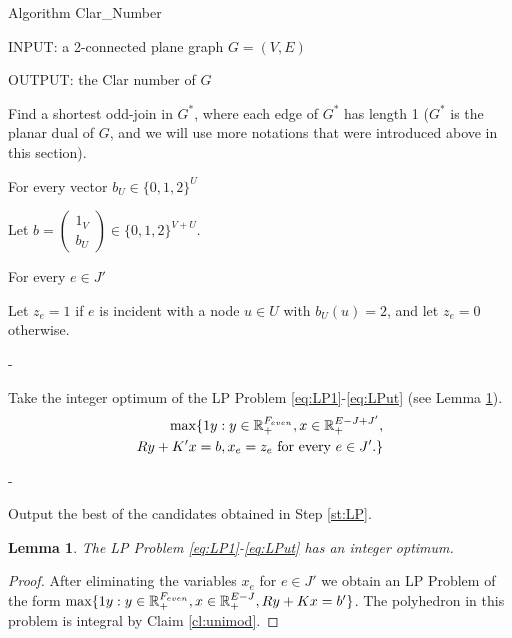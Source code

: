 \documentclass{article}
\makeatletter
\newcounter{Kulso}
\newenvironment{pszkod}[2][1]
{
  \setcounter{Kulso}{#1}
\sffamily
  \vspace{\topsep}              \noindent
{#2}
  \begin{list}{\rmfamily\arabic{Kulso}.\@arabic\c@enumiv.}
    {\usecounter{enumiv}\renewcommand\p@enumiv{\arabic{Kulso}.}
     \renewcommand\theenumiv{\@arabic\c@enumiv}
     \setlength{\parsep}{0pt}
     \setlength{\itemsep}{0pt}
     \setlength{\topsep}{0pt}
    }
  \psz@cimke{begin}
}
{
  \psz@cimke{end}
  \end{list}
  \vspace{\topsep}
}
\newlength{\tabhossz}
\newcommand{\untab}{\par \advance\@totalleftmargin -\tabhossz   \advance\linewidth \tabhossz
\parshape \@ne \@totalleftmargin \linewidth
\addtolength{\labelsep}{-\tabhossz}}
\newcommand{\psz@cimke}[1]{\item[{\makebox[\labelwidth][l]{#1}}]}
\newcommand{\Rset}{\mathbb{R}}
\newtheorem{lemma}{Lemma}
\makeatother
\begin{document}
\begin{pszkod}{Algorithm Clar\_Number}

\item[] INPUT: a 2-connected plane graph $G=(V,E)$

\item[] OUTPUT: the Clar number of $G$

\item Find a shortest odd-join in $G^*$,
where each edge of $G^*$ has length 1
($G^*$ is the planar dual of $G$, and we will use more  notations that were introduced above in this section).







\item For every vector $b_U\in \{0,1,2\}^U$ \label{st:iter}

\tab

  \item Let $b=\left(
    \begin{array}{c}
    1_V\\
    b_U
    \end{array}
    \right)\in \{0,1,2\}^{V+U}$. 

  \item For every $e\in J'$
    \tab

      \item Let $z_e = 1$  if $e$ is incident with a node $u\in U$ with $b_U(u) = 2$, and let $z_e = 0$ otherwise.

    \untab

  \item \label{st:LP} Take the integer optimum of the LP Problem
    \eqref{eq:LP1}-\eqref{eq:LPut} (see Lemma \ref{lem:intpoly}).
  \begin{eqnarray}
    \max\{1y: y\in \Rset_+^{\Feven}, x\in \Rset_+^{E-J+J'},\label{eq:LP1}\\
    Ry + K' x = b, 
    x_e=z_e\mbox{ for every  }e\in J'.\label{eq:LPut}
  \}
  \end{eqnarray}

\untab

\item Output the best of the candidates obtained in Step \ref{st:LP}.

\end{pszkod}

\begin{lemma}\label{lem:intpoly}
The LP Problem \eqref{eq:LP1}-\eqref{eq:LPut} has an integer optimum.
\end{lemma}
\begin{proof}
After eliminating the variables $x_e$ for $e\in J'$ we obtain an LP
Problem of the form $\max\{1y: y\in \Rset_+^{\Feven}, x\in
\Rset_+^{E-J}, Ry + K x = b'\}$. The polyhedron in this problem is
integral by Claim \ref{cl:unimod}.
\end{proof}
\end{document}
